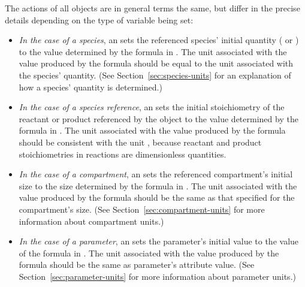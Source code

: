 The actions of all \InitialAssignment objects are in general terms
the same, but differ in the precise details depending on the type
of variable being set:
\begin{itemize}

\item \emph{In the case of a species}, an \InitialAssignment sets
  the referenced species' initial quantity
  ( or ) to the value
  determined by the formula in .  The unit associated
  with the value produced by the  formula should be
  equal to the unit associated with the species' quantity.  (See
  Section~\ref{sec:species-units} for an explanation of how a
  species' quantity is determined.)

\item \emph{In the case of a species reference}, an
  \InitialAssignment sets the initial stoichiometry of the
  reactant or product referenced by the \SpeciesReference object
  to the value determined by the formula in .  The
  unit associated with the value produced by the 
  formula should be consistent with the unit
  , because reactant and product
  stoichiometries in reactions are dimensionless quantities.

\item \emph{In the case of a compartment}, an \InitialAssignment
  sets the referenced compartment's initial size to the size
  determined by the formula in .  The unit associated
  with the value produced by the  formula should be
  the same as that specified for the compartment's size.  (See
  Section~\ref{sec:compartment-units} for more information about
  compartment units.)

\item \emph{In the case of a parameter}, an \InitialAssignment
  sets the parameter's initial value to the value of the formula
  in .  The unit associated with the value produced by
  the  formula should be the same as parameter's
   attribute value.  (See
  Section~\ref{sec:parameter-units} for more information about
  parameter units.)


\end{itemize}


